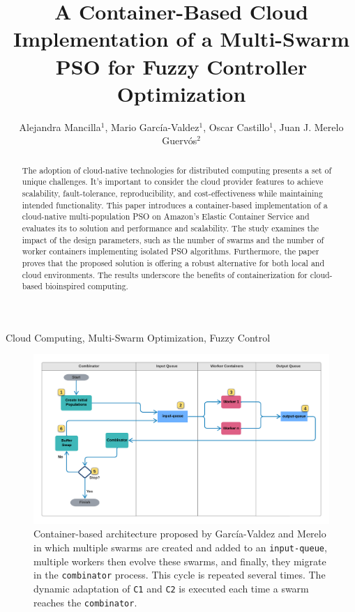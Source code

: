 \documentclass{cys}
\title{A Container-Based Cloud Implementation of a Multi-Swarm PSO for Fuzzy Controller Optimization}
\author{Alejandra Mancilla$^1$, Mario García-Valdez$^1$, Oscar Castillo$^1$, Juan J. Merelo Guerv\'os$^2$}
\affil{ 
$^1$  Tijuana Institute of Technology / Tecnol\'ogico Nacional de M\'exico,   \authorcr   %
Tijuana, Mexico

\authorcr \authorcr
$^2$  University of Granada, Department of Computer Engineering, Automatics and Robotics, \authorcr
Granada, Spain            
\authorcr  \authorcr
\{alejandra.mancilla,mario\}@tectijuana.edu.mx, ocastillo@tectijuana.mx, jmerelo@ugr.es
\authorcr  \authorcr
}
\begin{document}
\maketitle

\renewcommand{\tablename}{Table}

\begin{abstract}

The adoption of cloud-native technologies for distributed computing presents a
set of unique challenges. It's important to consider the cloud provider features
to achieve scalability, fault-tolerance, reproducibility, and cost-effectiveness
while maintaining intended functionality. This paper introduces a
container-based implementation of a cloud-native multi-population PSO on
Amazon's Elastic Container Service and evaluates its to solution and performance and
scalability. The study examines the impact of the design parameters, such as
the number of swarms and the number of worker containers implementing isolated
PSO algorithms. Furthermore, the paper proves that the proposed solution
is offering a robust alternative for both local and cloud environments. The
results underscore the benefits of containerization for cloud-based bioinspired
computing.

\end{abstract}

\begin{keywords} 
Cloud Computing, Multi-Swarm Optimization, Fuzzy Control
\end{keywords} 

\begin{figure}[ht]
\centering
\includegraphics[width=\textwidth]{KafkEO}
\caption{Container-based architecture proposed by García-Valdez and Merelo \cite{valdez2021container} 
in which multiple swarms are created and
added to an \texttt{input-queue}, multiple workers then evolve these swarms, and finally,
they migrate in the \texttt{combinator} process. This cycle is repeated several times.
The dynamic adaptation of \texttt{C1} and \texttt{C2} is executed each time a swarm reaches the
\texttt{combinator}.}
\label{fig:KafkEO}
\end{figure}
\end{document}
